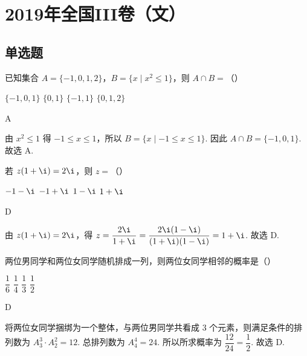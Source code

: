 \chapter{2019年全国III卷（文）}

\section{单选题}

\begin{problem}
已知集合 \(A=\{-1,0,1,2\}\)，\(B=\{x\mid x^2\le1\}\)，则 \(A\cap B=\)（\quad）

\choices
    {\(\{-1,0,1\}\)}
    {\(\{0,1\}\)}
    {\(\{-1,1\}\)}
    {\(\{0,1,2\}\)}
\end{problem}

\begin{answer}
A
\end{answer}

\begin{solution}
由 \(x^2\le1\) 得 \(-1\le x\le1\)，所以 \(B=\{x\mid -1\le x\le1\}\). 因此 \(A\cap B=\{-1,0,1\}\). 故选 A.
\end{solution}

\begin{problem}
若 \(z(1+\i)=2\i\)，则 \(z=\)（\quad）

\choices
    {\(-1-\i\)}
    {\(-1+\i\)}
    {\(1-\i\)}
    {\(1+\i\)}
\end{problem}

\begin{answer}
D
\end{answer}

\begin{solution}
由 \(z(1+\i)=2\i\)，得 \(z=\dfrac{2\i}{1+\i}=\dfrac{2\i(1-\i)}{(1+\i)(1-\i)}=1+\i\). 故选 D.
\end{solution}

\begin{problem}
两位男同学和两位女同学随机排成一列，则两位女同学相邻的概率是（\quad）

\choices
    {\(\dfrac16\)}
    {\(\dfrac14\)}
    {\(\dfrac13\)}
    {\(\dfrac12\)}
\end{problem}

\begin{answer}
D
\end{answer}

\begin{solution}
将两位女同学捆绑为一个整体，与两位男同学共看成 \(3\) 个元素，则满足条件的排列数为 \(A_3^3\cdot A_2^2=12\). 总排列数为 \(A_4^4=24\). 所以所求概率为 \(\dfrac{12}{24}=\dfrac12\). 故选 D.
\end{solution}


